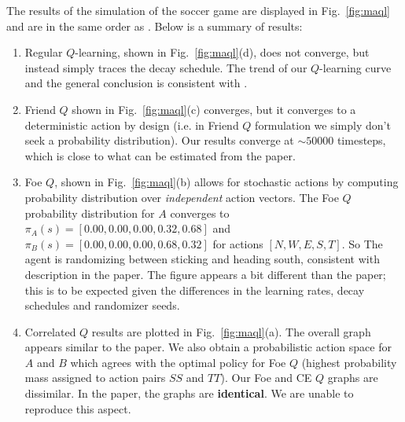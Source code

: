\documentclass[conference]{IEEEtran}
\begin{document}
The results of the simulation of the soccer game are displayed in Fig.~\ref{fig:maql} and are in the same order as \cite{greenwald}. Below is a summary of results:
%
\begin{enumerate}
\item Regular $Q$-learning, shown in Fig.~\ref{fig:maql}(d), does not converge, but instead simply traces the decay schedule. The trend of our $Q$-learning curve and the general conclusion is consistent with \cite{greenwald}.
%
\item Friend $Q$ shown in Fig.~\ref{fig:maql}(c) converges, but it converges to a deterministic action  by design (i.e. in Friend $Q$ formulation we simply don't seek a probability distribution). Our results converge at $\sim50000$ timesteps, which is close to what can be estimated from the paper. 
%
\item Foe $Q$, shown in Fig.~\ref{fig:maql}(b) allows for stochastic actions by computing probability distribution over {\em independent} action vectors. The Foe $Q$ probability distribution for $A$ converges to $\pi_A(s) = [0.00, 0.00, 0.00, 0.32, 0.68]$ and $\pi_B(s) = [0.00, 0.00, 0.00, 0.68, 0.32]$ for actions $[N, W, E, S, T]$. So The agent is randomizing between sticking and heading south, consistent with description in the paper. The figure appears a bit different than the paper; this is to be expected given the differences in the learning rates, decay schedules and randomizer seeds.
%
\item Correlated $Q$ results are plotted in Fig.~\ref{fig:maql}(a). The overall graph appears similar to the paper. We also obtain a probabilistic action space for $A$ and $B$ which agrees with the optimal policy for Foe $Q$ (highest probability mass assigned to action pairs $SS$ and $TT$). Our Foe and CE $Q$ graphs are dissimilar. In the paper, the graphs are {\bf identical}. We are unable to reproduce this aspect.
\end{enumerate}
\end{document}
